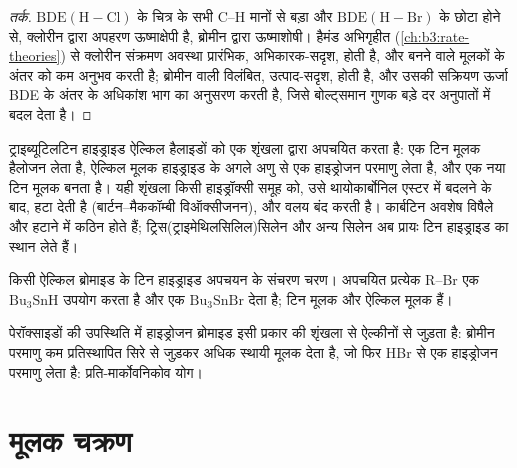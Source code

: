 \begin{proof}[तर्क]
$\mathrm{BDE(H{-}Cl)}$ के चित्र के सभी C--H मानों से बड़ा और $\mathrm{BDE(H{-}Br)}$ के छोटा होने से,
क्लोरीन द्वारा अपहरण ऊष्माक्षेपी है, ब्रोमीन द्वारा ऊष्माशोषी। हैमंड
अभिगृहीत (\cref{ch:b3:rate-theories}) से क्लोरीन संक्रमण अवस्था प्रारंभिक,
अभिकारक-सदृश, होती है, और बनने वाले मूलकों के अंतर को कम अनुभव करती है;
ब्रोमीन वाली विलंबित, उत्पाद-सदृश, होती है, और उसकी सक्रियण ऊर्जा BDE के
अंतर के अधिकांश भाग का अनुसरण करती है, जिसे बोल्ट्समान गुणक बड़े दर अनुपातों में बदल देता है।
\end{proof}

ट्राइब्यूटिलटिन हाइड्राइड ऐल्किल हैलाइडों को एक शृंखला द्वारा अपचयित करता है: एक टिन मूलक
हैलोजन लेता है, ऐल्किल मूलक हाइड्राइड के अगले अणु से एक हाइड्रोजन परमाणु लेता है,
और एक नया टिन मूलक बनता है। यही शृंखला किसी हाइड्रॉक्सी समूह को,
उसे थायोकार्बोनिल एस्टर में बदलने के बाद, हटा देती है (बार्टन--मैककॉम्बी
विऑक्सीजनन), और वलय बंद करती है। कार्बटिन अवशेष विषैले और हटाने में कठिन
होते हैं; ट्रिस(ट्राइमेथिलसिलिल)सिलेन और अन्य सिलेन अब प्रायः टिन
हाइड्राइड का स्थान लेते हैं।

\begin{omfigure}

{\small किसी ऐल्किल ब्रोमाइड के टिन हाइड्राइड अपचयन के संचरण चरण।
अपचयित प्रत्येक R--Br एक $\mathrm{Bu_3SnH}$ उपयोग करता है और एक $\mathrm{Bu_3SnBr}$ देता है; 
टिन मूलक और ऐल्किल मूलक हैं।}
\end{omfigure}

पेरॉक्साइडों की उपस्थिति में हाइड्रोजन ब्रोमाइड इसी प्रकार की शृंखला से ऐल्कीनों से जुड़ता है:
ब्रोमीन परमाणु कम प्रतिस्थापित सिरे से जुड़कर अधिक
स्थायी मूलक देता है, जो फिर HBr से एक हाइड्रोजन परमाणु लेता है: प्रति-मार्कोवनिकोव
योग।

\section{मूलक चक्रण}

